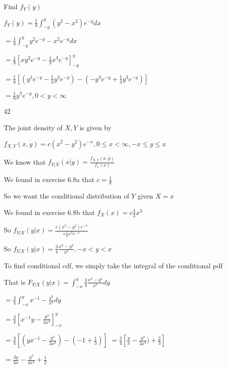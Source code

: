 \documentclass[11pt]{article}
\begin{document}
\begin{itemize}
	Find $f_Y(y)$

	$f_Y(y) = \frac{1}{8} \int_{-y}^{y} (y^2 - x^2) e^{-y} dx$

	$= \frac{1}{8} \int_{-y}^{y} y^2 e^{-y} - x^2e^{-y} dx$

	$ = \frac{1}{8} [xy^2 e^{-y} - \frac{1}{3}x^3 e^{-y}]_{-y}^{y}$

	$= \frac{1}{8} [(y^3 e^{-y} - \frac{1}{3}y^3 e^{-y}) - (-y^3 e^{-y} + \frac{1}{3}y^3 e^{-y})] $

	$=\frac{1}{6} y^3 e^{-y}, 0 < y < \infty$





\item[42]

	The joint density of $X, Y$ is given by

	$f_{X,Y}(x,y) = c(x^2 - y^2)e^{-x}, 0 \leq x < \infty, -x \leq y \leq x$

	We know that $f_{Y|X}(x|y) = \frac{f_{X,Y}(x,y)}{f_{x}(x)}$

	We found in exercise 6.8a that $c = \frac{1}{8}$

	So we want the conditional distribution of $Y$ given $X = x$

	We found in exercise 6.8b that $f_X(x) = c\frac{4}{3}x^3$

	So $f_{Y|X}(y|x) = \frac{c(x^2 - y^2)e^{-x}}{c\frac{4}{3}x^3e^{-x}}$

	So $f_{Y|X}(y|x) = \frac{3}{4}\frac{x^2-y^2}{x^3}, -x < y < x$

	To find conditional cdf, we simply take the integral of the conditional pdf

	That is $F_{Y|X}(y|x) = \int_{-x}^{y} \frac{3}{4} \frac{x^2 - y^2}{x^3} dy$

	$= \frac{3}{4} \int_{-x}^{y} x^{-1} - \frac{y^2}{x^3}dy$

	$= \frac{3}{4}[x^{-1}y - \frac{y^3}{3x^3}]_{-x}^{y}$

	$= \frac{3}{4}[(yx^{-1} - \frac{y^3}{3x^3}) - (-1 + \frac{1}{3})]$ 
	$= \frac{3}{4}[\frac{y}{x} - \frac{y^3}{3x^3}) + \frac{2}{3}]$

	$=\frac{3y}{4x} - \frac{y^3}{4x^3} + \frac{1}{2}$
\end{itemize}
\end{document}
